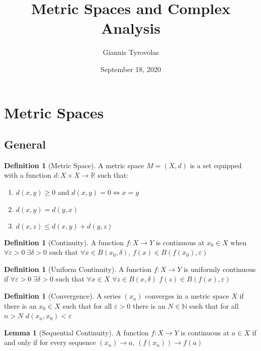 \documentclass[11pt,a4paper, titlepage]{article}
\title{Metric Spaces and Complex Analysis}
\author{Giannis Tyrovolas}
\date{September 18, 2020}
\theoremstyle{definition}
\newtheorem{definition}[theorem]{Definition}
\newtheorem{lemma}[theorem]{Lemma}
\begin{document}
\maketitle

\section{Metric Spaces}

\subsection{General}

\begin{definition}[Metric Space]
A metric space $M = (X, d)$ is a set equipped with a function $d \colon X \times X \longrightarrow \mathbb{R}$ such that:

\begin{enumerate}
	\item $d(x,y) \geqslant 0 $ and $d(x,y) = 0 \iff x = y$
	\item $d(x,y) = d(y,x)$
	\item $d(x,z) \leqslant d(x,y) + d(y,z)$
\end{enumerate}
\end{definition}

\begin{definition}[Continuity]
A function $f \colon X \longrightarrow Y$ is continuous at $x_0 \in X$ when $\forall \varepsilon > 0 \; \exists \delta > 0$ such that $\forall x \in B(x_0, \delta)$, $f(x) \in B(f(x_0), \varepsilon)$
\end{definition} 

\begin{definition}[Uniform Continuity]
A function $f \colon X \longrightarrow Y$ is uniformly continuous if $\forall \varepsilon >0 \; \exists \delta > 0$ such that $ \forall x \in X$ $\forall z \in B(x,\delta)$ $f(z) \in B(f(x), \varepsilon)$
\end{definition}

\begin{definition}[Convergence]
A series $(x_n)$ converges in a metric space $X$ if there is an $x_0 \in X$ such that for all $\varepsilon > 0$ there is an $N \in \mathbb{N}$ such that for all $ n > N$ $d(x_n, x_0) < \varepsilon$
\end{definition}

\begin{lemma}[Sequential Continuity]
A function $f \colon X \longrightarrow Y$ is continuous at $a \in X$ if and only if for every sequence $(x_n) \to a$, $(f(x_n)) \to f(a)$
\end{lemma}
\end{document}
